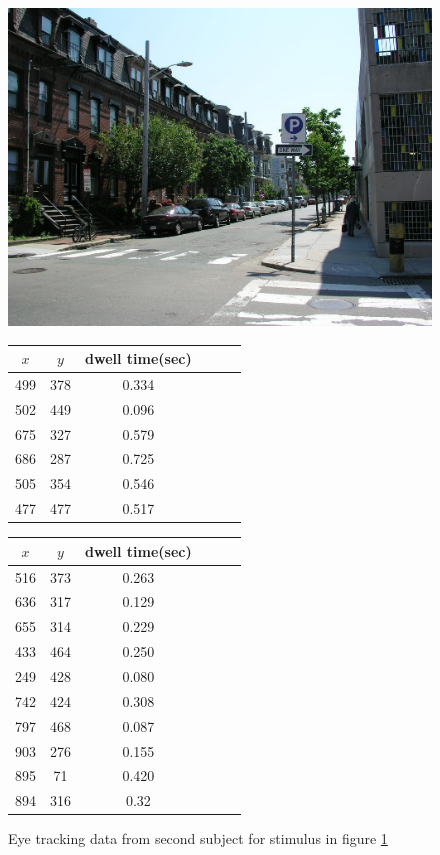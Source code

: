\documentclass{article} %
\begin{document}
\begin{figure}[!htb]
  \includegraphics[width=\linewidth]{dataset.jpeg}
  \caption{Sample stimulus from \cite{Judd_2009}}\label{fig:dataset}
\endminipage\hfill
{}
\begin{tabular}{ |c|c|c|c|c|c|} 
 \hline
  $x$ & $y$ & dwell time(sec)\\ 
  \hline
499 &378& 0.334\\ 
502 &449& 0.096\\
675 &327& 0.579\\ 
686 &287& 0.725\\ 
505 &354& 0.546\\ 
477 &477& 0.517\\ 
 \hline

\end{tabular}
\caption{Eye tracking data from first subject for stimulus in figure \ref{fig:dataset}}
\endminipage\hfill
{}
\begin{tabular}{ |c|c|c|c|c|c|} 

 \hline
  $x$ & $y$ & dwell time(sec)\\ 
 \hline
 516 & 373&0.263 \\
 636 &317&0.129 \\
 655 &314& 0.229\\
 433 &464&0.250\\ 
 249 &428&0.080\\ 
 742&424&0.308\\
 797&468&0.087\\
 903&276&0.155\\
 895&71&0.420\\
 894&316&0.32\\
 \hline
\end{tabular}
\caption{Eye tracking data from second subject for stimulus in figure \ref{fig:dataset}}
\endminipage
\end{figure}
\end{document}
